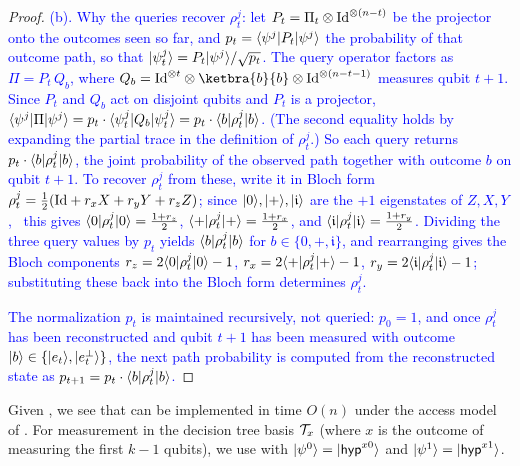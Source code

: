 \begin{proof}
\textcolor{blue}{(b). Why the queries recover $\rho^j_t$: 
let $P_t=\Pi_t\otimes\mathrm{Id}^{\otimes(n-t)}$ be the projector onto the outcomes seen so far, 
and $p_t=\langle\smash{\psi^j}\rvert P_t\lvert\smash{\psi^j}\rangle$ the probability of that outcome path, 
so that $\lvert\smash{\psi^j_t}\rangle=P_t\lvert\smash{\psi^j}\rangle/\sqrt{p_t}$. 
The query operator factors as $\Pi=P_t\,Q_b$, 
where $Q_b=\Id^{\otimes t}\otimes\ketbra{b}{b}\otimes\Id^{\otimes(n-t-1)}$ measures qubit $t+1$. 
Since $P_t$ and $Q_b$ act on disjoint qubits and $P_t$ is a projector, 
$\langle\smash{\psi^j}\rvert\Pi\lvert\smash{\psi^j}\rangle=p_t\cdot\langle\smash{\psi^j_t}\rvert Q_b\lvert\smash{\psi^j_t}\rangle = p_t\cdot\langle b\rvert\rho^j_t\lvert b\rangle$. 
(The second equality holds by expanding the partial trace in the definition of $\rho_t^j$.)
So each query returns $p_t\cdot\langle b\rvert\rho^j_t\lvert b\rangle$, the joint probability of the observed path together with outcome $b$ on qubit $t+1$. 
To recover $\rho^j_t$ from these, write it in Bloch form $\rho^j_t=\tfrac12(\mathrm{Id}+r_xX+r_yY+r_zZ)$; since $\lvert0\rangle,\lvert+\rangle,\lvert\mathfrak{i}\rangle$ are the $+1$ eigenstates of $Z,X,Y$, \
this gives $\langle0\rvert\rho^j_t\lvert0\rangle=\tfrac{1+r_z}{2}$, $\langle+\rvert\rho^j_t\lvert+\rangle=\tfrac{1+r_x}{2}$, and $\langle\mathfrak{i}\rvert\rho^j_t\lvert\mathfrak{i}\rangle=\tfrac{1+r_y}{2}$. 
Dividing the three query values by $p_t$ yields $\langle b\rvert\rho^j_t\lvert b\rangle$ for $b\in\{0,+,\mathfrak{i}\}$, 
and rearranging gives the Bloch components $r_z=2\langle0\rvert\rho^j_t\lvert0\rangle-1$, $r_x=2\langle+\rvert\rho^j_t\lvert+\rangle-1$, $r_y=2\langle\mathfrak{i}\rvert\rho^j_t\lvert\mathfrak{i}\rangle-1$; 
substituting these back into the Bloch form determines $\rho^j_t$.}

\textcolor{blue}{The normalization $p_t$ is maintained recursively, not queried: $p_0=1$, and once $\rho^j_t$ has been reconstructed and qubit $t+1$ has been measured with outcome $\lvert b\rangle\in\{\lvert e_t\rangle,\lvert\smash{e_t^\perp}\rangle\}$, the next path probability is computed from the reconstructed state as $p_{t+1}=p_t\cdot\langle b\rvert\rho^j_t\lvert b\rangle$.}
\end{proof}
Given , we see that  can be implemented in time $O(n)$ under the access model of . For measurement in the decision tree basis $\mathcal{T}_x$ (where $x$ is the outcome of measuring the first $k-1$ qubits), we use  with $\lvert\psi^0\rangle=\lvert\mathsf{hyp}^{x0}\rangle$ and $\lvert\psi^1\rangle=\lvert\mathsf{hyp}^{x1}\rangle$.


